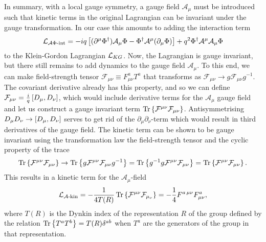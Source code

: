 \documentclass[../main.tex]{subfiles}
\begin{document}
In summary, with a local gauge symmetry, a gauge field \(\mathcal{A}_\mu\) must
be introduced such that kinetic terms in the original Lagrangian can be
invariant under the gauge transformation. In our case this amounts to adding
the interaction term
\begin{equation}
  \mathcal{L}_{\mathcal{A}\Phi\text{-int}} = -iq\left[(\partial^\mu \Phi^\dagger)
    \mathcal{A}_\mu \Phi - \Phi^\dagger \mathcal{A}^\mu (\partial_\mu
    \Phi)\right] + q^2
  \Phi^\dagger \mathcal{A}^\mu \mathcal{A}_\mu \Phi
\end{equation}
to the Klein-Gordon Lagrangian \(\mathcal{L}_{KG}\).
Now, the Lagrangian is gauge invariant, but there still remains to add dynamics
to the gauge field \(\mathcal{A}_\mu\).
To this end, we can make field-strength tensor \(\mathcal{F}_{\mu\nu} \equiv
F_{\mu\nu}^a T^a\) that transforms as \(\mathcal{F}_{\mu\nu} \to g
\mathcal{F}_{\mu\nu} g^{-1}\).
The covariant derivative already has this property, and so we can define
\(\mathcal{F}_{\mu\nu} = \frac{i}{q} \left[D_\mu,D_\nu\right]\), which would include
derivative terms for the \(\mathcal{A}_\mu\) gauge field and let us construct a
gauge invariant term \(\operatorname{Tr}\left\{\mathcal{F}^{\mu\nu} \mathcal{F}_{\mu\nu}\right\}\).
Antisymmetrising \(D_\mu D_\nu \to \left[D_\mu,D_\nu\right]\) serves to get rid of the \(\partial_\mu \partial_\nu\)-term which would result in third derivatives of the gauge field.
The kinetic term can be shown to be gauge invariant using the transformation law the field-strength tensor and the cyclic property of the trace
\begin{equation}
  \operatorname{Tr}\left\{\mathcal{F}^{\mu\nu} \mathcal{F}_{\mu\nu}\right\} \to
  \operatorname{Tr}\left\{g \mathcal{F}^{\mu\nu} \mathcal{F}_{\mu\nu} g^{-1}\right\} =
  \operatorname{Tr}\left\{g^{-1} g \mathcal{F}^{\mu\nu} \mathcal{F}_{\mu\nu}\right\} =
  \operatorname{Tr}\left\{\mathcal{F}^{\mu\nu} \mathcal{F}_{\mu\nu}\right\}.
\end{equation}
This results in a kinetic term for the \(\mathcal{A}_\mu\)-field
\begin{equation}
  \label{qft:eq:Akin}
  \mathcal{L}_{\mathcal{A}\text{-kin}} = -\frac{1}{4T(R)} \operatorname{Tr}\left\{\mathcal{F}^{\mu\nu} \mathcal{F}_{\mu_\nu}\right\} = -\frac{1}{4} F^{a\,\mu\nu} F^a_{\mu\nu},
\end{equation}
where \(T(R)\) is the Dynkin index of the representation \(R\) of the group defined by the relation \(\operatorname{Tr}\left\{T^a T^b\right\} = T(R) \delta^{ab}\) when \(T^a\) are the generators of the group in that representation.
\end{document}
